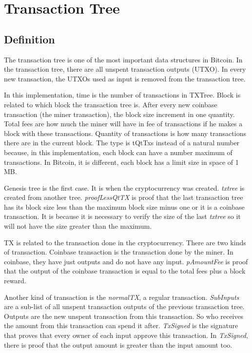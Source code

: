 \section{Transaction Tree}

\subsection{Definition}

The transaction tree is one of the most important data structures in Bitcoin.
In the transaction tree, there are all unspent transaction outputs (UTXO).
In every new transaction, the UTXOs used as input is removed from the transaction tree.


In this implementation, time is the number of transactions in TXTree.
Block is related to which block the transaction tree is.
After every new coinbase transaction (the miner transaction), the block size increment in one quantity.
Total fees are how much the miner will have in fee of transactions if he makes a block with these
transactions.
Quantity of transactions is how many transactions there are in the current block.
The type is tQtTxs instead of a natural number because, in this implementation, each block can have
a number maximum of transactions.
In Bitcoin, it is different, each block has a limit size in space of 1 MB.

Genesis tree is the first case.
It is when the cryptocurrency was created.
\emph{txtree} is created from another tree.
\emph{proofLessQtTX} is proof that the last transaction tree has its
block size less than the maximum block size minus one or it is a coinbase transaction.
It is because it is necessary to verify the size of the last \emph{txtree} so it will not have
the size greater than the maximum.


TX is related to the transaction done in the cryptocurrency.
There are two kinds of transaction.
Coinbase transaction is the transaction done by the miner.
In coinbase, they have just outputs and do not have any input.
\emph{pAmountFee} is proof that the output of the coinbase transaction is equal to the total fees plus
a block reward.

Another kind of transaction is the \emph{normalTX}, a regular transaction.
\emph{SubInputs} are a sub-list of all unspent transaction outputs of the previous transaction tree.
Outputs are the new unspent transaction from this transaction.
So who receives the amount from this transaction can spend it after.
\emph{TxSigned} is the signature that proves that every owner of each input approve this transaction.
In \emph{TxSigned}, there is proof that the output amount is greater than the input amount too.


